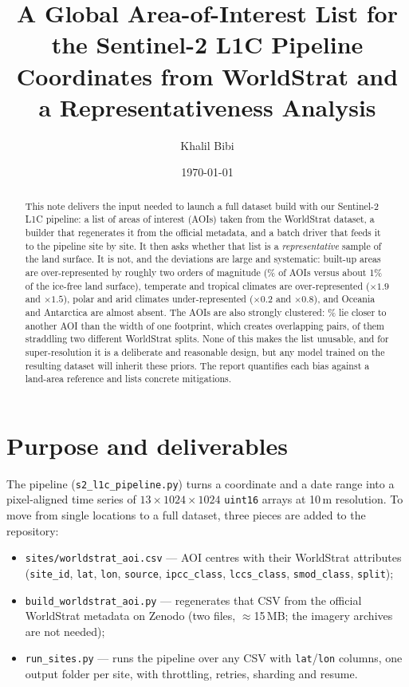 \documentclass[11pt,a4paper]{article}
\title{\vspace{-1.5cm}A Global Area-of-Interest List for the Sentinel-2 L1C Pipeline\\
\large Coordinates from WorldStrat and a Representativeness Analysis}
\author{Khalil Bibi}
\date{\today}
\newcommand{\ratio}[1]{$\times#1$}
\begin{document}
\maketitle

\begin{abstract}
\noindent
This note delivers the input needed to launch a full dataset build with our Sentinel-2 L1C
pipeline: a list of \NAOI{} areas of interest (AOIs) taken from the WorldStrat dataset, a
builder that regenerates it from the official metadata, and a batch driver that feeds it to the
pipeline site by site. It then asks whether that list is a \emph{representative} sample of the
land surface. It is not, and the deviations are large and systematic: built-up areas are
over-represented by roughly two orders of magnitude (\SettlementShare\% of AOIs versus about
1\% of the ice-free land surface), temperate and tropical climates are over-represented
(\ratio{1.9} and \ratio{1.5}), polar and arid climates under-represented (\ratio{0.2} and
\ratio{0.8}), and Oceania and Antarctica are almost absent. The AOIs are also strongly
clustered: \ClusteredShare\% lie closer to another AOI than the width of one footprint, which
creates \OverlapPairs{} overlapping pairs, \CrossSplitPairs{} of them straddling two different
WorldStrat splits. None of this makes the list unusable, and for super-resolution it is a
deliberate and reasonable design, but any model trained on the resulting dataset will inherit
these priors. The report quantifies each bias against a land-area reference and lists concrete
mitigations.
\end{abstract}

\section{Purpose and deliverables}

The pipeline (\texttt{s2\_l1c\_pipeline.py}) turns a coordinate and a date range into a
pixel-aligned time series of $13\times1024\times1024$ \texttt{uint16} arrays at 10\,m
resolution. To move from single locations to a full dataset, three pieces are added to the
repository:

\begin{itemize}
  \item \texttt{sites/worldstrat\_aoi.csv} --- \NAOI{} AOI centres with their WorldStrat
        attributes (\texttt{site\_id}, \texttt{lat}, \texttt{lon}, \texttt{source},
        \texttt{ipcc\_class}, \texttt{lccs\_class}, \texttt{smod\_class}, \texttt{split});
  \item \texttt{build\_worldstrat\_aoi.py} --- regenerates that CSV from the official WorldStrat
        metadata on Zenodo (two files, $\approx$15\,MB; the imagery archives are not needed);
  \item \texttt{run\_sites.py} --- runs the pipeline over any CSV with \texttt{lat}/\texttt{lon}
        columns, one output folder per site, with throttling, retries, sharding and resume.
\end{itemize}
\end{document}

